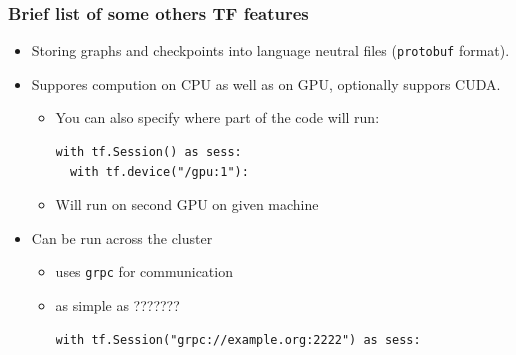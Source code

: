\documentclass[10pt,utf8]{beamer}
\begin{document}
\begin{frame}[fragile]
	\frametitle{Brief list of some others TF features}
	\begin{itemize}
		\item Storing graphs and checkpoints into language neutral files (\texttt{protobuf} format).
		\pause
		\item Suppores compution on CPU as well as on GPU, optionally suppors CUDA.
		\begin{itemize}
			\item You can also specify where part of the code will run:
			\begin{lstlisting}[style=Python]
with tf.Session() as sess:
  with tf.device("/gpu:1"):
			\end{lstlisting}
			\item Will run on second GPU on given machine
		\end{itemize}
		\pause
		\item Can be run across the cluster 
		\begin{itemize}
			\item uses \texttt{grpc} for communication 
			\item as simple as  ???????
			\begin{lstlisting}[style=Python]
with tf.Session("grpc://example.org:2222") as sess:
			\end{lstlisting}
		\end{itemize}
	\end{itemize}
\end{frame}
\end{document}
